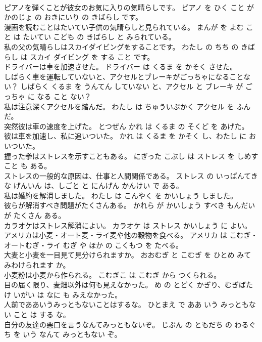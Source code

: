 \documentclass[8pt]{extreport}
\begin{document}
\begin{CJK}{UTF8}{min}
\\	ピアノを弾くことが彼女のお気に入りの気晴らしです。	ピアノ を ひく こと が かのじょ の おきにいり の きばらし です。	
\\	漫画を読むことはたいてい子供の気晴らしと見られている。	まんが を よむ こと は たいてい こども の きばらし と みられている。	
\\	私の父の気晴らしはスカイダイビングをすることです。	わたし の ちち の きばらし は スカイ ダイビング を する こと です。	
\\	ドライバーは車を加速させた。	ドライバー は くるま を かそく させた。	
\\	しばらく車を運転していないと、アクセルとブレーキがごっちゃになることない？	しばらく くるま を うんてん していない と、アクセル と ブレーキ が ごっちゃ に なる こと ない？	
\\	私は注意深くアクセルを踏んだ。	わたし は ちゅういぶかく アクセル を ふんだ。	
\\	突然彼は車の速度を上げた。	とつぜん かれ は くるま の そくど を あげた。	
\\	彼は車を加速し、私に追いついた。	かれ は くるま を かそく し、わたし に おいついた。	
\\	握った拳はストレスを示すこともある。	にぎった こぶし は ストレス を しめす こと も ある。	
\\	ストレスの一般的な原因は、仕事と人間関係である。	ストレス の いっぱんてき な げんいん は、しごと と にんげん かんけい で ある。	
\\	私は婚約を解消しました。	わたし は こんやく を かいしょう しました。	
\\	彼らが解消すべき問題がたくさんある。	かれら が かいしょう すべき もんだい が たくさん ある。	
\\	カラオケはストレス解消によい。	カラオケ は ストレス かいしょう に よい。	
\\	アメリカは小麦・オート麦・ライ麦や他の穀物を食べる。	アメリカ は こむぎ・オートむぎ・ライ むぎ や ほか の こくもつ を たべる。	
\\	大麦と小麦を一目見て見分けられますか。	おおむぎ と こむぎ を ひとめ みて みわけられます か。	
\\	小麦粉は小麦から作られる。	こむぎこ は こむぎ から つくられる。	
\\	目の届く限り、麦畑以外は何も見えなかった。	め の とどく かぎり、むぎばたけ いがい は なに も みえなかった。	
\\	人前でああいうみっともないことはするな。	ひとまえ で ああ いう みっともない こと は する な。	
\\	自分の友達の悪口を言うなんてみっともないぞ。	じぶん の ともだち の わるぐち を いう なんて みっともない ぞ。	

\end{CJK}
\end{document}
